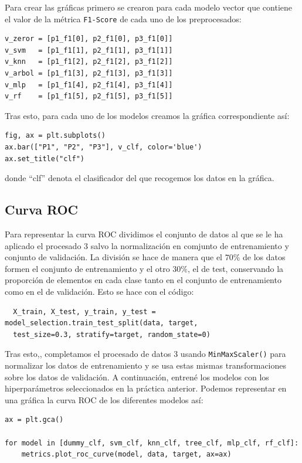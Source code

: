 \documentclass[a4]{article}
\begin{document}
Para crear las gráficas primero se crearon para cada modelo vector que contiene el valor de la métrica \texttt{F1-Score} de cada uno de los preprocesados:

\begin{lstlisting}
v_zeror = [p1_f1[0], p2_f1[0], p3_f1[0]]
v_svm   = [p1_f1[1], p2_f1[1], p3_f1[1]]
v_knn   = [p1_f1[2], p2_f1[2], p3_f1[2]]
v_arbol = [p1_f1[3], p2_f1[3], p3_f1[3]]
v_mlp   = [p1_f1[4], p2_f1[4], p3_f1[4]]
v_rf    = [p1_f1[5], p2_f1[5], p3_f1[5]]
\end{lstlisting}

Tras esto, para cada uno de los modelos creamos la gráfica correspondiente así:

\begin{lstlisting}
fig, ax = plt.subplots()
ax.bar(["P1", "P2", "P3"], v_clf, color='blue')
ax.set_title("clf")
\end{lstlisting}

donde ``clf'' denota el clasificador del que recogemos los datos en la gráfica.  

\subsection{Curva ROC}

Para representar la curva ROC dividimos el conjunto de datos al que se le ha aplicado el procesado 3 salvo la normalización en comjunto de entrenamiento y conjunto de validación. La división se hace de manera que el $70\%$ de los datos formen el conjunto de entrenamiento y el otro $30\%$, el de test, conservando la proporción de elementos en cada clase tanto en el conjunto de entrenamiento como en el de validación. Esto se hace con el código:

\begin{lstlisting}
  X_train, X_test, y_train, y_test = model_selection.train_test_split(data, target,
  test_size=0.3, stratify=target, random_state=0)
\end{lstlisting}

Tras esto,, completamos el procesado de datos $3$ usando \texttt{MinMaxScaler()} para normalizar los datos de entrenamiento y se usa estas mismas transformaciones sobre los datos de validación. A continuación, entrené los modelos con los hiperparámetros seleccionados en la práctica anterior. Podemos representar en una gráfica la curva ROC de los diferentes modelos así:

\begin{lstlisting}
ax = plt.gca()

for model in [dummy_clf, svm_clf, knn_clf, tree_clf, mlp_clf, rf_clf]:
    metrics.plot_roc_curve(model, data, target, ax=ax)  
\end{lstlisting}
\end{document}
